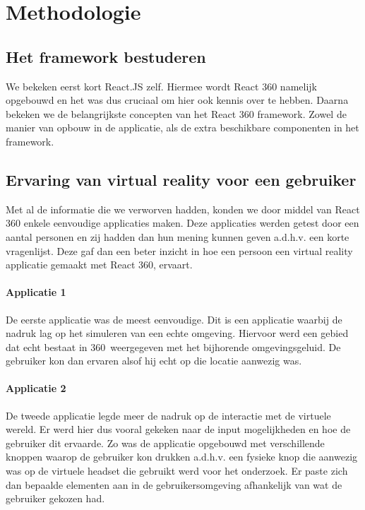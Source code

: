 
\chapter{Methodologie}
\label{ch:methodologie}


\section{Het framework bestuderen}
\label{sec:reactvr-bestuderen}
We bekeken eerst kort React.JS zelf. Hiermee wordt React 360 namelijk opgebouwd en het was dus cruciaal om hier ook kennis over te hebben. Daarna bekeken we de belangrijkste concepten van het React 360 framework. Zowel de manier van opbouw in de applicatie, als de extra beschikbare componenten in het framework.

\section{Ervaring van virtual reality voor een gebruiker}
\label{sec:ervaring-vr-app}
Met al de informatie die we verworven hadden, konden we door middel van React 360 enkele eenvoudige applicaties maken. Deze applicaties werden getest door een aantal personen en zij hadden dan hun mening kunnen geven a.d.h.v. een korte vragenlijst. Deze gaf dan een beter inzicht in hoe een persoon een virtual reality applicatie gemaakt met React 360, ervaart.

\subsubsection{Applicatie 1}
De eerste applicatie was de meest eenvoudige. Dit is een applicatie waarbij de nadruk lag op het simuleren van een echte omgeving. Hiervoor werd een gebied dat echt bestaat in 360\textdegree\ weergegeven met het bijhorende omgevingsgeluid. De gebruiker kon dan ervaren alsof hij echt op die locatie aanwezig was.

\subsubsection{Applicatie 2}
De tweede applicatie legde meer de nadruk op de interactie met de virtuele wereld. Er werd hier dus vooral gekeken naar de input mogelijkheden en hoe de gebruiker dit ervaarde. Zo was de applicatie opgebouwd met verschillende knoppen waarop de gebruiker kon drukken a.d.h.v. een fysieke knop die aanwezig was op de virtuele headset die gebruikt werd voor het onderzoek. Er paste zich dan bepaalde elementen aan in de gebruikersomgeving afhankelijk van wat de gebruiker gekozen had.

